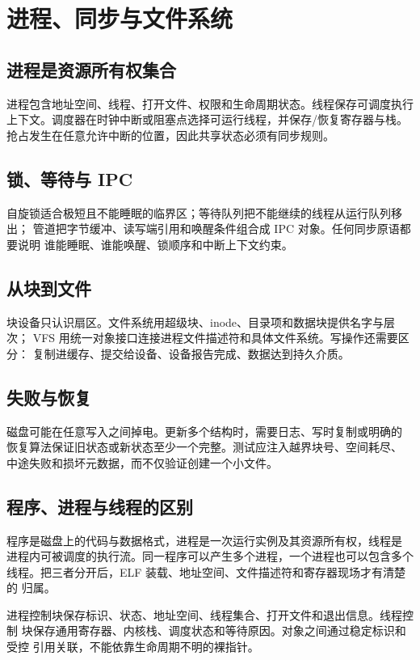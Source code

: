 \chapter{进程、同步与文件系统}

\section{进程是资源所有权集合}

进程包含地址空间、线程、打开文件、权限和生命周期状态。线程保存可调度执行
上下文。调度器在时钟中断或阻塞点选择可运行线程，并保存/恢复寄存器与栈。
抢占发生在任意允许中断的位置，因此共享状态必须有同步规则。

\section{锁、等待与 IPC}

自旋锁适合极短且不能睡眠的临界区；等待队列把不能继续的线程从运行队列移出；
管道把字节缓冲、读写端引用和唤醒条件组合成 IPC 对象。任何同步原语都要说明
谁能睡眠、谁能唤醒、锁顺序和中断上下文约束。

\section{从块到文件}

块设备只认识扇区。文件系统用超级块、inode、目录项和数据块提供名字与层次；
VFS 用统一对象接口连接进程文件描述符和具体文件系统。写操作还需要区分：
复制进缓存、提交给设备、设备报告完成、数据达到持久介质。

\section{失败与恢复}

磁盘可能在任意写入之间掉电。更新多个结构时，需要日志、写时复制或明确的
恢复算法保证旧状态或新状态至少一个完整。测试应注入越界块号、空间耗尽、
中途失败和损坏元数据，而不仅验证创建一个小文件。

\section{程序、进程与线程的区别}

程序是磁盘上的代码与数据格式，进程是一次运行实例及其资源所有权，线程是
进程内可被调度的执行流。同一程序可以产生多个进程，一个进程也可以包含多个
线程。把三者分开后，ELF 装载、地址空间、文件描述符和寄存器现场才有清楚的
归属。

进程控制块保存标识、状态、地址空间、线程集合、打开文件和退出信息。线程控制
块保存通用寄存器、内核栈、调度状态和等待原因。对象之间通过稳定标识和受控
引用关联，不能依靠生命周期不明的裸指针。

